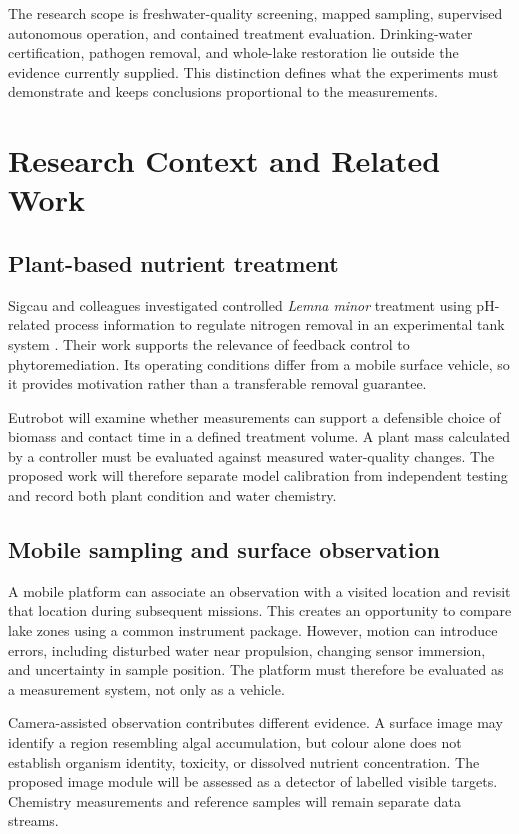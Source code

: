 \documentclass[12pt,a4paper]{article}
\newcommand{\papersection}[1]{\clearpage\section{#1}}
\begin{document}
The research scope is freshwater-quality screening, mapped sampling, supervised autonomous operation, and contained treatment evaluation. Drinking-water certification, pathogen removal, and whole-lake restoration lie outside the evidence currently supplied. This distinction defines what the experiments must demonstrate and keeps conclusions proportional to the measurements.

\papersection{Research Context and Related Work}
\subsection{Plant-based nutrient treatment}
Sigcau and colleagues investigated controlled \textit{Lemna minor} treatment using pH-related process information to regulate nitrogen removal in an experimental tank system \cite{sigcau2022}. Their work supports the relevance of feedback control to phytoremediation. Its operating conditions differ from a mobile surface vehicle, so it provides motivation rather than a transferable removal guarantee.

Eutrobot will examine whether measurements can support a defensible choice of biomass and contact time in a defined treatment volume. A plant mass calculated by a controller must be evaluated against measured water-quality changes. The proposed work will therefore separate model calibration from independent testing and record both plant condition and water chemistry.

\subsection{Mobile sampling and surface observation}
A mobile platform can associate an observation with a visited location and revisit that location during subsequent missions. This creates an opportunity to compare lake zones using a common instrument package. However, motion can introduce errors, including disturbed water near propulsion, changing sensor immersion, and uncertainty in sample position. The platform must therefore be evaluated as a measurement system, not only as a vehicle.

Camera-assisted observation contributes different evidence. A surface image may identify a region resembling algal accumulation, but colour alone does not establish organism identity, toxicity, or dissolved nutrient concentration. The proposed image module will be assessed as a detector of labelled visible targets. Chemistry measurements and reference samples will remain separate data streams.
\end{document}
